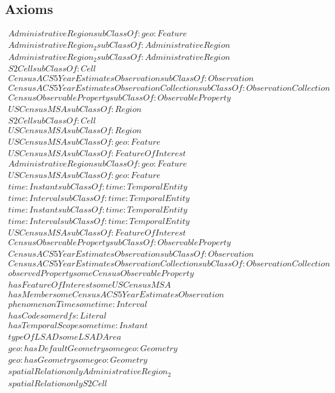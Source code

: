 \subsection{Axioms}
\begin{align}
  AdministrativeRegion subClassOf: geo:Feature\\
  AdministrativeRegion_2 subClassOf: AdministrativeRegion\\
  AdministrativeRegion_2 subClassOf: AdministrativeRegion\\
  S2Cell subClassOf: Cell\\
  CensusACS5YearEstimatesObservation subClassOf: Observation\\
  CensusACS5YearEstimatesObservationCollection subClassOf: ObservationCollection\\
  CensusObservableProperty subClassOf: ObservableProperty\\
  USCensusMSA subClassOf: Region\\
  S2Cell subClassOf: Cell\\
  USCensusMSA subClassOf: Region\\
  USCensusMSA subClassOf: geo:Feature\\
  USCensusMSA subClassOf: FeatureOfInterest\\
  AdministrativeRegion subClassOf: geo:Feature\\
  USCensusMSA subClassOf: geo:Feature\\
  time:Instant subClassOf: time:TemporalEntity\\
  time:Interval subClassOf: time:TemporalEntity\\
  time:Instant subClassOf: time:TemporalEntity\\
  time:Interval subClassOf: time:TemporalEntity\\
  USCensusMSA subClassOf: FeatureOfInterest\\
  CensusObservableProperty subClassOf: ObservableProperty\\
  CensusACS5YearEstimatesObservation subClassOf: Observation\\
  CensusACS5YearEstimatesObservationCollection subClassOf: ObservationCollection\\
  observedProperty some CensusObservableProperty \\
  hasFeatureOfInterest some USCensusMSA \\
  hasMember some CensusACS5YearEstimatesObservation \\
  phenomenonTime some time:Interval \\
  hasCode some rdfs:Literal \\
  hasTemporalScope some time:Instant \\
  typeOfLSAD some LSADArea \\
  geo:hasDefaultGeometry some geo:Geometry \\
  geo:hasGeometry some geo:Geometry \\
  spatialRelation only AdministrativeRegion_2 \\
  spatialRelation only S2Cell \end{align}


